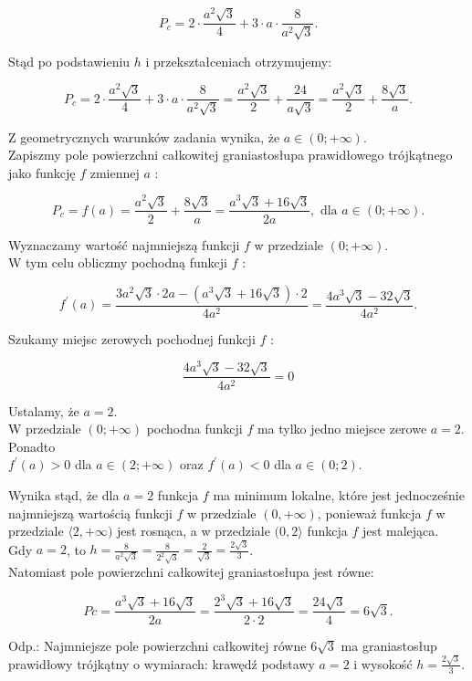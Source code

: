 \documentclass[10pt]{article}
\begin{document}
$$
P_{c}=2 \cdot \frac{a^{2} \sqrt{3}}{4}+3 \cdot a \cdot \frac{8}{a^{2} \sqrt{3}} .
$$

Stąd po podstawieniu $h$ i przekształceniach otrzymujemy:

$$
P_{c}=2 \cdot \frac{a^{2} \sqrt{3}}{4}+3 \cdot a \cdot \frac{8}{a^{2} \sqrt{3}}=\frac{a^{2} \sqrt{3}}{2}+\frac{24}{a \sqrt{3}}=\frac{a^{2} \sqrt{3}}{2}+\frac{8 \sqrt{3}}{a} .
$$

Z geometrycznych warunków zadania wynika, że $a \in(0 ;+\infty)$.\\
Zapiszmy pole powierzchni całkowitej graniastosłupa prawidłowego trójkątnego jako funkcję $f$ zmiennej $a$ :

$$
P_{c}=f(a)=\frac{a^{2} \sqrt{3}}{2}+\frac{8 \sqrt{3}}{a}=\frac{a^{3} \sqrt{3}+16 \sqrt{3}}{2 a}, \text { dla } a \in(0 ;+\infty) .
$$

Wyznaczamy wartość najmniejszą funkcji $f$ w przedziale $(0 ;+\infty)$.\\
W tym celu obliczmy pochodną funkcji $f$ :

$$
f^{\prime}(a)=\frac{3 a^{2} \sqrt{3} \cdot 2 a-\left(a^{3} \sqrt{3}+16 \sqrt{3}\right) \cdot 2}{4 a^{2}}=\frac{4 a^{3} \sqrt{3}-32 \sqrt{3}}{4 a^{2}} .
$$

Szukamy miejsc zerowych pochodnej funkcji $f$ :

$$
\frac{4 a^{3} \sqrt{3}-32 \sqrt{3}}{4 a^{2}}=0
$$

Ustalamy, że $a=2$.\\
W przedziale $(0 ;+\infty)$ pochodna funkcji $f$ ma tylko jedno miejsce zerowe $a=2$.\\
Ponadto\\
$f^{\prime}(a)>0$ dla $a \in(2 ;+\infty)$ oraz $f^{\prime}(a)<0$ dla $a \in(0 ; 2)$.

Wynika stąd, że dla $a=2$ funkcja $f$ ma minimum lokalne, które jest jednocześnie najmniejszą wartością funkcji $f$ w przedziale $(0,+\infty)$, ponieważ funkcja $f$ w przedziale $\langle 2,+\infty)$ jest rosnąca, a w przedziale $(0,2\rangle$ funkcja $f$ jest malejąca.\\
Gdy $a=2$, to $h=\frac{8}{a^{2} \sqrt{3}}=\frac{8}{2^{2} \sqrt{3}}=\frac{2}{\sqrt{3}}=\frac{2 \sqrt{3}}{3}$.\\
Natomiast pole powierzchni całkowitej graniastosłupa jest równe:

$$
P c=\frac{a^{3} \sqrt{3}+16 \sqrt{3}}{2 a}=\frac{2^{3} \sqrt{3}+16 \sqrt{3}}{2 \cdot 2}=\frac{24 \sqrt{3}}{4}=6 \sqrt{3} .
$$

Odp.: Najmniejsze pole powierzchni całkowitej równe $6 \sqrt{3}$ ma graniastosłup prawidłowy trójkątny o wymiarach: krawędź podstawy $a=2$ i wysokość $h=\frac{2 \sqrt{3}}{3}$.
\end{document}
